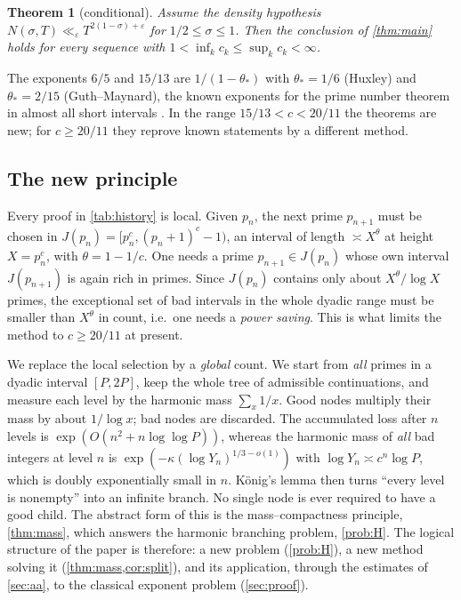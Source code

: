 \documentclass[11pt,a4paper]{article}
\newtheorem{theorem}{Theorem}[section]
\theoremstyle{definition}
\newcommand{\eps}{\varepsilon}
\begin{document}
\begin{theorem}[conditional]\label{thm:DH}
Assume the density hypothesis $N(\sigma,T)\ll_\eps T^{2(1-\sigma)+\eps}$ for $1/2\le\sigma\le1$.
Then the conclusion of \cref{thm:main} holds for every sequence with $1<\inf_k c_k\le\sup_k c_k<\infty$.
\end{theorem}

The exponents $6/5$ and $15/13$ are $1/(1-\theta_*)$ with $\theta_*=1/6$ (Huxley) and $\theta_*=2/15$
(Guth--Maynard), the known exponents for the prime number theorem in almost all short intervals
\cite{Hux72,GM24,expdb}. In the range $15/13<c<20/11$ the theorems are new; for $c\ge 20/11$ they
reprove known statements by a different method.

\subsection{The new principle}
Every proof in \cref{tab:history} is local. Given $p_n$, the next prime $p_{n+1}$ must be chosen in
$J(p_n)=[p_n^{c},(p_n+1)^c-1)$, an interval of length $\asymp X^{\theta}$ at height $X=p_n^c$, with
$\theta=1-1/c$. One needs a prime $p_{n+1}\in J(p_n)$ whose own interval $J(p_{n+1})$ is again rich in primes.
Since $J(p_n)$ contains only about $X^\theta/\log X$ primes, the exceptional set of bad intervals in the
whole dyadic range must be smaller than $X^{\theta}$ in count, i.e.\ one needs a \emph{power saving}.
This is what limits the method to $c\ge 20/11$ at present.

We replace the local selection by a \emph{global} count. We start from \emph{all} primes in a dyadic
interval $[P,2P]$, keep the whole tree of admissible continuations, and measure each level by the
harmonic mass $\sum_x 1/x$. Good nodes multiply their mass by about $1/\log x$; bad nodes are discarded.
The accumulated loss after $n$ levels is $\exp(O(n^2+n\log\log P))$, whereas the harmonic mass of
\emph{all} bad integers at level $n$ is $\exp(-\kappa(\log Y_n)^{1/3-o(1)})$ with $\log Y_n\asymp c^{n}\log P$,
which is doubly exponentially small in $n$. König's lemma then turns ``every level is nonempty'' into an
infinite branch. No single node is ever required to have a good child. The abstract form of this is the
mass--compactness principle, \cref{thm:mass}, which answers the harmonic branching problem, \cref{prob:H}.
The logical structure of the paper is therefore: a new problem (\cref{prob:H}), a new method solving it
(\cref{thm:mass,cor:split}), and its application, through the estimates of \cref{sec:aa}, to the classical
exponent problem (\cref{sec:proof}).
\end{document}
